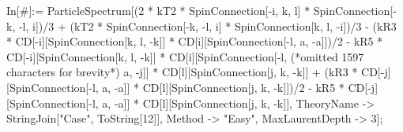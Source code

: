 In[\#]:= ParticleSpectrum[(2 * kT2 * SpinConnection[-i, k, l] * SpinConnection[-k, -l, i])/3 + (kT2 * SpinConnection[-k, -l, i] * SpinConnection[k, l, -i])/3 - (kR3 * CD[-i][SpinConnection[k, l, -k]] * CD[i][SpinConnection[-l, a, -a]])/2 - kR5 * CD[-i][SpinConnection[k, l, -k]] * CD[i][SpinConnection[-l, (*omitted 1597 characters for brevity*) a, -j]] * CD[l][SpinConnection[j, k, -k]] + (kR3 * CD[-j][SpinConnection[-l, a, -a]] * CD[l][SpinConnection[j, k, -k]])/2 - kR5 * CD[-j][SpinConnection[-l, a, -a]] * CD[l][SpinConnection[j, k, -k]], TheoryName -> StringJoin["Case", ToString[12]], Method -> "Easy", MaxLaurentDepth -> 3];